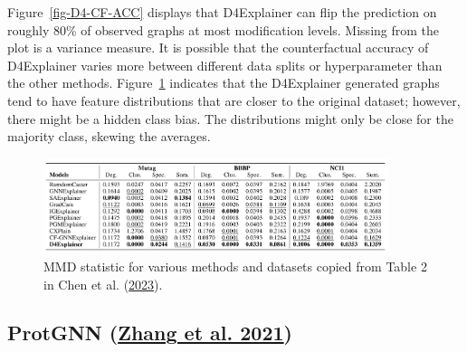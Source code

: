 \documentclass[
  11pt,
  letterpaper,
]{article}
\begin{document}
Figure~\ref{fig-D4-CF-ACC} displays that D4Explainer can flip the
prediction on roughly 80\% of observed graphs at most modification
levels. Missing from the plot is a variance measure. It is possible that
the counterfactual accuracy of D4Explainer varies more between different
data splits or hyperparameter than the other methods.
Figure~\ref{fig-D4-MMD} indicates that the D4Explainer generated graphs
tend to have feature distributions that are closer to the original
dataset; however, there might be a hidden class bias. The distributions
might only be close for the majority class, skewing the averages.

\begin{figure}

{\centering \includegraphics[width=0.9\textwidth,height=\textheight]{figures/D4-MMD-Table.png}

}

\caption{\label{fig-D4-MMD}MMD statistic for various methods and
datasets copied from Table 2 in Chen et al.
(\protect\hyperlink{ref-Chen_Wu_Gupta_Ying_2023}{2023}).}

\end{figure}

\hypertarget{protgnn-zhang_liu_wang_lu_lee_2021}{%
\subsection{\texorpdfstring{ProtGNN
(\protect\hyperlink{ref-Zhang_Liu_Wang_Lu_Lee_2021}{Zhang et al.
2021})}{ProtGNN (Zhang et al. 2021)}}\label{protgnn-zhang_liu_wang_lu_lee_2021}}
\end{document}
